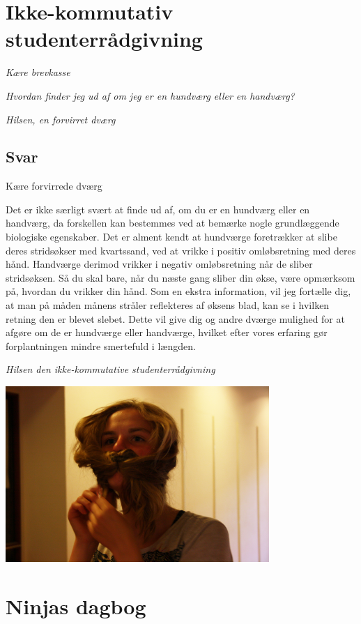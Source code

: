 \begin{minipage}[t]{100mm}
\vspace{3mm}
\section*{Ikke-kommutativ studenterrådgivning}
\emph{Kære brevkasse}

\emph{Hvordan finder jeg ud af om jeg er en hun\-dværg eller en han\-dværg?}

\emph{Hilsen, en forvirret dværg}

\subsection*{Svar}
Kære forvirrede dværg

Det er ikke særligt svært at finde ud af, om du er en hundværg eller en handværg, da forskellen kan bestemmes ved at bemærke nogle grundlæggende biologiske egenskaber. Det er alment kendt at hundværge foretrækker at slibe deres stridsøkser med kvartssand, ved at vrikke i positiv omløbsretning med deres hånd. Handværge derimod vrikker i negativ omløbsretning når de sliber stridsøksen. Så du skal bare, når du næste gang sliber din økse, være opmærksom på, hvordan du vrikker din hånd. Som en ekstra information, vil jeg fortælle dig, at man på måden månens stråler reflekteres af øksens blad, kan se i hvilken retning den er blevet slebet. Dette vil give dig og andre dværge mulighed for at afgøre om de er hundværge eller handværge, hvilket efter vores erfaring gør forplantningen mindre smertefuld i længden.

{\flushright\emph{Hilsen den ikke-kommutative studenterrådgivning}}

\includegraphics[width=100mm]{kum.jpg}

\section*{Ninjas dagbog}


\end{minipage}
